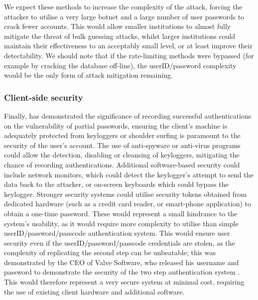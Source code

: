 \documentclass[british,11pt,a4paper]{article}
\begin{document}
We expect these methods to increase the complexity of the attack, forcing the attacker to utilise a very large botnet and a large number of user passwords to crack fewer accounts. This would allow smaller institutions to almost fully mitigate the threat of bulk guessing attacks, whilst larger institutions could maintain their effectiveness to an acceptably small level, or at least improve their detectability. We should note that if the rate-limiting methods were bypassed (for example by cracking the database off-line), the userID/password complexity would be the only form of attack mitigation remaining.

\subsubsection{Client-side security}
Finally, \citet{Aspinall2013-sh} has demonstrated the significance of recording successful authentications on the vulnerability of partial passwords, ensuring the client's machine is adequately protected from keyloggers or shoulder surfing is paramount to the security of the user's account. The use of anti-spyware or anti-virus programs could allow the detection, disabling or cleansing of keyloggers, mitigating the chance of recording authentications. Additional software-based security could include network monitors, which could detect the keylogger's attempt to send the data back to the attacker, or on-screen keyboards which could bypass the keylogger. Stronger security systems could utilise security tokens obtained from dedicated hardware (such as a credit card reader, or smart-phone application) to obtain a one-time password. These would represent a small hindrance to the system's usability, as it would require more complexity to utilise than simple userID/password/passcode authentication system. This would ensure user security even if the userID/password/passcode credentials are stolen, as the complexity of replicating the second step can be unbeatable; this was demonstrated by the CEO of Valve Software, who released his username and password to demonstrate the security of the two step authentication system \cite{Purslow2011-qa}. This would therefore represent a very secure system at minimal cost, requiring the use of existing client hardware and additional software.

\clearpage


\clearpage
\end{document}
